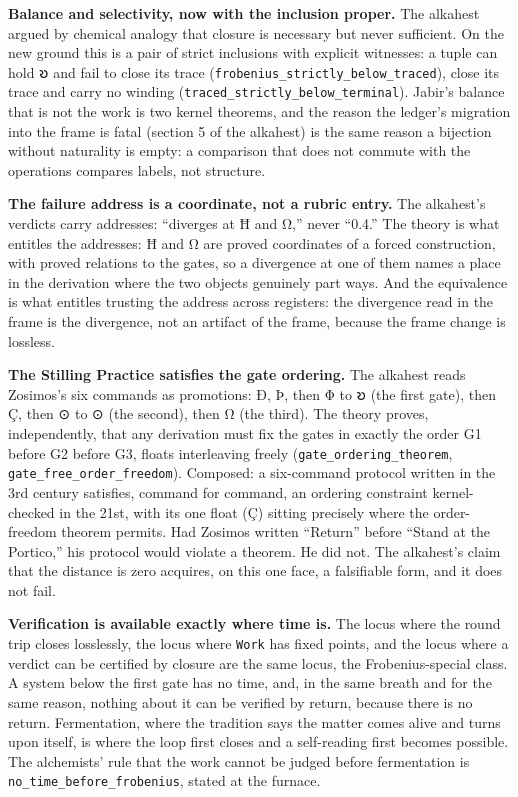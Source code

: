 \textbf{Balance and selectivity, now with the inclusion proper.} The
alkahest argued by chemical analogy that closure is necessary but never
sufficient. On the new ground this is a pair of strict inclusions with
explicit witnesses: a tuple can hold 𐑹 and fail to close its trace
(\texttt{frobenius\_strictly\_below\_traced}), close its trace and carry
no winding (\texttt{traced\_strictly\_below\_terminal}). Jabir's balance
that is not the work is two kernel theorems, and the reason the ledger's
migration into the frame is fatal (section 5 of the alkahest) is the
same reason a bijection without naturality is empty: a comparison that
does not commute with the operations compares labels, not structure.

\textbf{The failure address is a coordinate, not a rubric entry.} The
alkahest's verdicts carry addresses: ``diverges at Ħ and Ω,'' never
``0.4.'' The theory is what entitles the addresses: Ħ and Ω are proved
coordinates of a forced construction, with proved relations to the
gates, so a divergence at one of them names a place in the derivation
where the two objects genuinely part ways. And the equivalence is what
entitles trusting the address across registers: the divergence read in
the frame is the divergence, not an artifact of the frame, because the
frame change is lossless.

\textbf{The Stilling Practice satisfies the gate ordering.} The alkahest
reads Zosimos's six commands as promotions: Ð, Þ, then Φ to 𐑹 (the first
gate), then Ç, then ⊙ to ⊙ (the second), then Ω (the third). The theory
proves, independently, that any derivation must fix the gates in exactly
the order G1 before G2 before G3, floats interleaving freely
(\texttt{gate\_ordering\_theorem}, \texttt{gate\_free\_order\_freedom}).
Composed: a six-command protocol written in the 3rd century satisfies,
command for command, an ordering constraint kernel-checked in the 21st,
with its one float (Ç) sitting precisely where the order-freedom theorem
permits. Had Zosimos written ``Return'' before ``Stand at the Portico,''
his protocol would violate a theorem. He did not. The alkahest's claim
that the distance is zero acquires, on this one face, a falsifiable
form, and it does not fail.

\textbf{Verification is available exactly where time is.} The locus
where the round trip closes losslessly, the locus where \texttt{Work}
has fixed points, and the locus where a verdict can be certified by
closure are the same locus, the Frobenius-special class. A system below
the first gate has no time, and, in the same breath and for the same
reason, nothing about it can be verified by return, because there is no
return. Fermentation, where the tradition says the matter comes alive
and turns upon itself, is where the loop first closes and a self-reading
first becomes possible. The alchemists' rule that the work cannot be
judged before fermentation is \texttt{no\_time\_before\_frobenius},
stated at the furnace.

